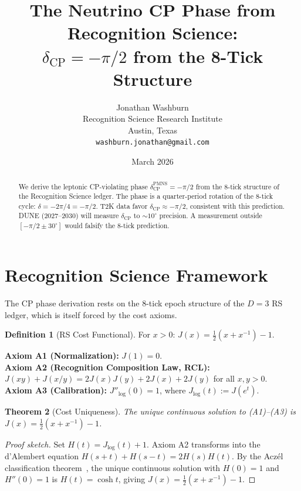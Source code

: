 \documentclass[12pt,a4paper]{article}
\title{The Neutrino CP Phase from Recognition Science:\\
$\delta_{\mathrm{CP}} = -\pi/2$ from the 8-Tick Structure}
\author{Jonathan Washburn\\
Recognition Science Research Institute\\
Austin, Texas\\
\texttt{washburn.jonathan@gmail.com}}
\date{March 2026}
\newtheorem{theorem}{Theorem}[section]
\theoremstyle{definition}
\newtheorem{definition}[theorem]{Definition}
\theoremstyle{remark}
\begin{document}
\maketitle

\begin{abstract}
We derive the leptonic CP-violating phase
$\delta_{\mathrm{CP}}^{\mathrm{PMNS}} = -\pi/2$ from the 8-tick
structure of the Recognition Science ledger.  The phase is a
quarter-period rotation of the 8-tick cycle: $\delta = -2\pi/4 =
-\pi/2$.  T2K data favor $\delta_{\mathrm{CP}} \approx -\pi/2$,
consistent with this prediction.  DUNE (2027--2030) will measure
$\delta_{\mathrm{CP}}$ to $\sim 10^\circ$ precision.  A measurement
outside $[-\pi/2 \pm 30^\circ]$ would falsify the 8-tick prediction.
\end{abstract}

\section{Recognition Science Framework}
\label{sec:framework}

The CP phase derivation rests on the 8-tick epoch structure of the
$D=3$ RS ledger, which is itself forced by the cost axioms.

\begin{definition}[RS Cost Functional]
For $x > 0$: $J(x) = \tfrac{1}{2}(x + x^{-1}) - 1$.
\end{definition}

\noindent\textbf{Axiom A1 (Normalization):} $J(1) = 0$.\\
\textbf{Axiom A2 (Recognition Composition Law, RCL):}
$J(xy)+J(x/y)=2J(x)J(y)+2J(x)+2J(y)$ for all $x,y>0$.\\
\textbf{Axiom A3 (Calibration):} $J''_{\log}(0) = 1$, where
$J_{\log}(t) := J(e^t)$.

\begin{theorem}[Cost Uniqueness]
\label{thm:unique}
The unique continuous solution to \textup{(A1)--(A3)} is
$J(x) = \tfrac{1}{2}(x + x^{-1}) - 1$.
\end{theorem}

\begin{proof}[Proof sketch]
Set $H(t) = J_{\log}(t)+1$.  Axiom A2 transforms into the d'Alembert
equation $H(s+t)+H(s-t)=2H(s)H(t)$.  By the Acz\'el classification
theorem~\cite{Aczel1966}, the unique continuous solution with $H(0)=1$
and $H''(0)=1$ is $H(t)=\cosh t$, giving
$J(x)=\tfrac{1}{2}(x+x^{-1})-1$.
\end{proof}
\end{document}
